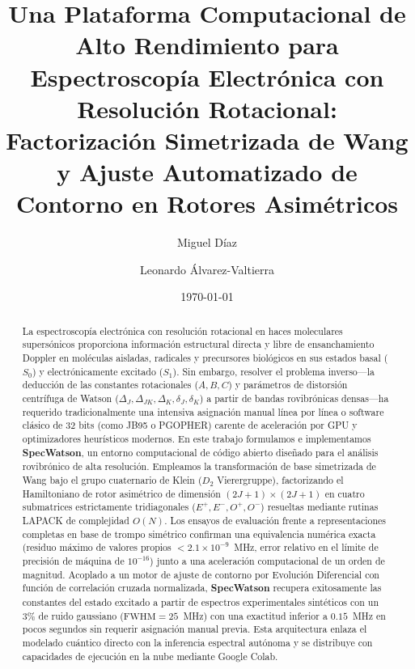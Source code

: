 \documentclass[aps,jcp,reprint,twocolumn,superscriptaddress,showpacs,amsmath,amssymb]{revtex4-2}
\begin{document}
\title{Una Plataforma Computacional de Alto Rendimiento para Espectroscop\'ia Electr\'onica con Resoluci\'on Rotacional: Factorizaci\'on Simetrizada de Wang y Ajuste Automatizado de Contorno en Rotores Asim\'etricos}

\author{Miguel D\'iaz}

\author{Leonardo \'Alvarez-Valtierra}

\date{\today}

\begin{abstract}
La espectroscop\'ia electr\'onica con resoluci\'on rotacional en haces moleculares supers\'onicos proporciona informaci\'on estructural directa y libre de ensanchamiento Doppler en mol\'eculas aisladas, radicales y precursores biol\'ogicos en sus estados basal ($S_0$) y electr\'onicamente excitado ($S_1$). Sin embargo, resolver el problema inverso---la deducci\'on de las constantes rotacionales ($A, B, C$) y par\'ametros de distorsi\'on centr\'ifuga de Watson ($\Delta_J, \Delta_{JK}, \Delta_K, \delta_J, \delta_K$) a partir de bandas rovibr\'onicas densas---ha requerido tradicionalmente una intensiva asignaci\'on manual l\'inea por l\'inea o software cl\'asico de 32 bits (como JB95 o PGOPHER) carente de aceleraci\'on por GPU y optimizadores heur\'isticos modernos. En este trabajo formulamos e implementamos \textbf{SpecWatson}, un entorno computacional de c\'odigo abierto dise\~nado para el an\'alisis rovibr\'onico de alta resoluci\'on. Empleamos la transformaci\'on de base simetrizada de Wang bajo el grupo cuaternario de Klein ($D_2$ Vierergruppe), factorizando el Hamiltoniano de rotor asim\'etrico de dimensi\'on $(2J+1) \times (2J+1)$ en cuatro submatrices estrictamente tridiagonales ($E^+, E^-, O^+, O^-$) resueltas mediante rutinas LAPACK de complejidad $O(N)$. Los ensayos de evaluaci\'on frente a representaciones completas en base de trompo sim\'etrico confirman una equivalencia num\'erica exacta (residuo m\'aximo de valores propios $< 2.1 \times 10^{-9}$~MHz, error relativo en el l\'imite de precisi\'on de m\'aquina de $10^{-16}$) junto a una aceleraci\'on computacional de un orden de magnitud. Acoplado a un motor de ajuste de contorno por Evoluci\'on Diferencial con funci\'on de correlaci\'on cruzada normalizada, \textbf{SpecWatson} recupera exitosamente las constantes del estado excitado a partir de espectros experimentales sint\'eticos con un $3\%$ de ruido gaussiano ($\text{FWHM} = 25$~MHz) con una exactitud inferior a $0.15$~MHz en pocos segundos sin requerir asignaci\'on manual previa. Esta arquitectura enlaza el modelado cu\'antico directo con la inferencia espectral aut\'onoma y se distribuye con capacidades de ejecuci\'on en la nube mediante Google Colab.
\end{abstract}
\end{document}
